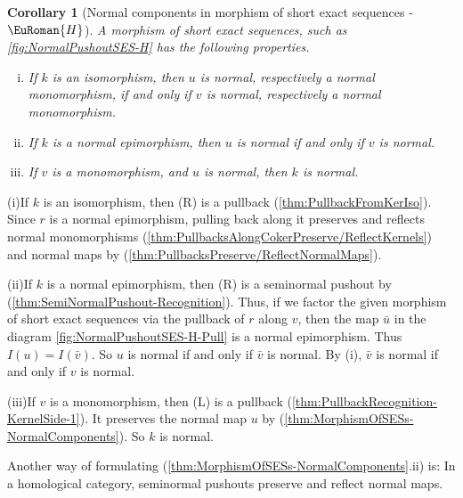 \documentclass [12pt,oneside]{book}%
\makeatletter
\theoremstyle{captionstyle}  %
\newtheorem{corollary}[theorem]{Corollary}
\renewenvironment{proof}[1][\proofname]{\vspace{-2ex}\par       %
	\pushQED{\qed}%
	\normalfont \topsep6\p@\@plus6\p@\relax
	\trivlist
	\item[\hskip\labelsep
	            \color{proofcaption}\bfseries                %
	            #1\@addpunct{\quad}]\ignorespaces
}{%
	\popQED\endtrivlist\@endpefalse
}
\newcommand{\Img}[1]{\textit{I}(#1)}	               %
\newcommand{\HTag}{ - {\color{Brown} $\EuRoman{H}$}}																					%
\makeatother
\begin{document}
\begin{corollary}[Normal components in morphism of short exact sequences\HTag]
    \label{thm:MorphismOfSESs-Properness}%
    \label{thm:MorphismOfSESs-NormalComponents}%
    A morphism of short exact sequences, such as \eqref{fig:NormalPushoutSES-H} has the following properties. %
    \begin{enumerate}[(i)]
        \item If $k$ is an isomorphism, then $u$ is normal, respectively a normal monomorphism, if and only if $v$ is normal, respectively a normal monomorphism.
        \item If $k$ is a normal epimorphism, then $u$ is normal if and only if $v$ is normal.
        \item If $v$ is a monomorphism, and $u$ is normal, then $k$ is normal.
    \end{enumerate}
\end{corollary}
\begin{proof}
    (i)\quad If $k$ is an isomorphism, then (R) is a pullback (\ref{thm:PullbackFromKerIso}). Since $r$ is a normal epimorphism, pulling back along it preserves and reflects normal monomorphisms (\ref{thm:PullbacksAlongCokerPreserve/ReflectKernels}) and normal maps by (\ref{thm:PullbacksPreserve/ReflectNormalMaps}).

    (ii)\quad If $k$ is a normal epimorphism, then (R) is a seminormal pushout by (\ref{thm:SemiNormalPushout-Recognition}). Thus, if we factor the given morphism of short exact sequences via the pullback of $r$ along $v$, then the map $\bar{u}$ in the diagram \eqref{fig:NormalPushoutSES-H-Pull} is a normal epimorphism. Thus $\Img{u}=\Img{\bar{v}}$. So $u$ is normal if and only if $\bar{v}$ is normal. By (i), $\bar{v}$ is normal if and only if $v$ is normal.

    (iii)\quad If $v$ is a monomorphism, then (L) is a pullback (\ref{thm:PullbackRecognition-KernelSide-1}). It preserves the normal map $u$ by (\ref{thm:MorphismOfSESs-NormalComponents}).  So $k$ is normal.
\end{proof}

Another way of formulating (\ref{thm:MorphismOfSESs-NormalComponents}.ii) is: In a homological category, seminormal pushouts preserve and reflect normal maps.
\end{document}
